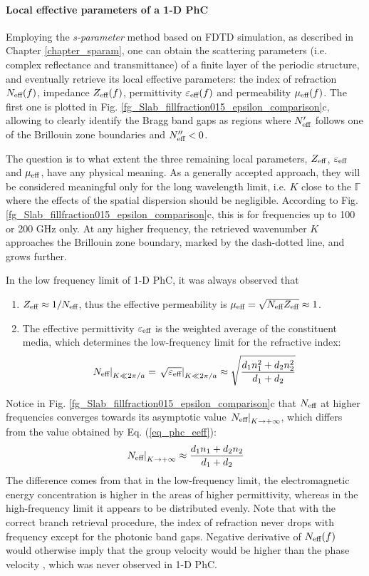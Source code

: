 \paragraph{Local effective parameters of a 1-D PhC}%
Employing the \textit{s-parameter} method based on FDTD simulation, as described in Chapter \ref{chapter_sparam}, one can obtain the scattering parameters (i.e. complex reflectance and transmittance) of a finite layer of the periodic structure, and eventually retrieve its local effective parameters: the index of refraction $N_{\text{eff} }(f)$, impedance $Z_{\text{eff} }(f)$, permittivity $\varepsilon_{\text{eff} }(f)$ and permeability $\mu_{\text{eff} }(f)$. The first one is plotted in Fig. \ref{fg_Slab_fillfraction015_epsilon_comparison}c, allowing to clearly identify the Bragg band gaps as regions where $N_{\text{eff} }'$ follows one of the Brillouin zone boundaries and $N_{\text{eff} }'' < 0$.

The question is to what extent the three remaining local parameters, $Z_{\text{eff} }$, $\varepsilon_{\text{eff} }$ and $\mu_{\text{eff} }$, have any physical meaning. As a generally accepted approach, they will be considered meaningful only for the long wavelength limit, i.e. $K$ close to the $\mathbb{\Gamma}$ where the effects of the spatial dispersion should be negligible. According to Fig. \ref{fg_Slab_fillfraction015_epsilon_comparison}c, this is for frequencies up to 100 or 200 GHz only. At any higher frequency, the retrieved wavenumber $K$ approaches the Brillouin zone boundary, marked by the dash-dotted line, and grows further.

In the low frequency limit of 1-D PhC, it was always observed that
\begin{enumerate}
\item{$Z_{\text{eff} } \approx 1/N_{\text{eff} }$, thus the effective permeability is $\mu_{\text{eff} } = \sqrt{N_{\text{eff} }Z_{\text{eff} }} \approx 1$.} 
\item{The effective permittivity $\varepsilon_{\text{eff} }$ is the weighted average of the constituent media, which determines the low-frequency limit for the refractive index:
	\begin{equation} \left.N_{\text{eff} }\right|_{K\ll 2\pi/a} =\left. \sqrt{\varepsilon_{\text{eff} }}\right|_{K\ll 2\pi/a} \approx \sqrt{\frac{d_1 n_1^{2} + d_2 n_2^{2}}{d_1+d_2}} \label{eq_phc_eeff}\end{equation}
	}
\end{enumerate}
Notice in Fig. \ref{fg_Slab_fillfraction015_epsilon_comparison}c that $N_{\text{eff} }$ at higher frequencies converges towards its asymptotic value $\left.N_{\text{eff} }\right|_{K\rightarrow +\infty}$, which differs from the value obtained by Eq. (\ref{eq_phc_eeff}):
\begin{equation} \left.N_{\text{eff} }\right|_{K\rightarrow +\infty} \approx \frac{d_1 n_1 + d_2 n_2}{d_1+d_2} \label{eq_phc_neff}\end{equation}
The difference comes from that in the low-frequency limit, the electromagnetic energy concentration is higher in the areas of higher permittivity, whereas in the high-frequency limit it appears to be distributed evenly.
Note that with the correct branch retrieval procedure, the index of refraction never drops with frequency except for the photonic band gaps. Negative derivative of $N_{\text{eff} }(f)$ would otherwise imply that the group velocity would be higher than the phase velocity \cite{mikki2009electromagnetic}, which was never observed in 1-D PhC.

